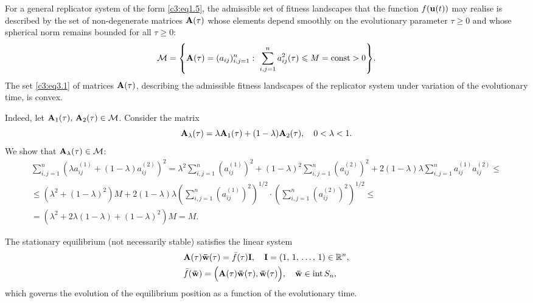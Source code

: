 \documentclass[12pt]{report}
\newcommand{\inside}{\mathrm{int}\,}
\newcommand{\const}{\mathrm{const}}
\theoremstyle{definition}
\theoremstyle{remark}
\begin{document}
For a general replicator system of the form \eqref{c3:eq1.5}, the admissible set of fitness landscapes that the function $f({\bf u}(t))$ may realise is described by the set of non-degenerate matrices ${\bf A}(\tau)$ whose elements depend smoothly on the evolutionary parameter $\tau \geqslant 0$ and whose spherical norm remains bounded for all $\tau \geqslant 0$:
\begin{equation}
	\mathcal{M} = \left\{{\bf A}(\tau) = (a_{ij})_{i, j = 1}^{n}:\,\, \sum
	\limits_{i, j = 1}^{n}a_{ij}^{2}(\tau) \leqslant M = \const > 0\right\}\!.
	\label{c3:eq3.1}
\end{equation}    
The set \eqref{c3:eq3.1} of matrices ${\bf A}(\tau)$, describing the admissible fitness landscapes of the replicator system under variation of the evolutionary time, is convex.

Indeed, let ${\bf A}_1(\tau),\, {\bf A}_2(\tau) \in \mathcal{M}$. Consider the matrix
\begin{equation*}
	{\bf A}_{\lambda}(\tau) = \lambda{\bf A}_1(\tau)+(1-\lambda){\bf A}_2(\tau), \quad 0 < \lambda < 1.
\end{equation*}
We show that ${\bf A}_{\lambda}(\tau) \in \mathcal{M}$:
\begin{gather*}
	\sum\limits_{i,j=1}^n \left(\lambda a_{ij}^{(1)}+(1-\lambda) a_{ij}^{(2)}\right)^2 =
	\lambda^2 \sum\limits_{i,j=1}^n \left(a_{ij}^{(1)}\right)^2
	+ (1-\lambda)^2 \sum\limits_{i,j=1}^n \left(a_{ij}^{(2)}\right)^2
	+ 2(1-\lambda)\lambda \sum\limits_{i,j=1}^n a_{ij}^{(1)} a_{ij}^{(2)} \leqslant \\
	\leqslant \left(\lambda^2 + (1-\lambda)^2\right) M
	+ 2(1-\lambda)\lambda
	\left(\sum\limits_{i,j=1}^n \left(a_{ij}^{(1)}\right)^2\right)^{1/2}
	\cdot
	\left(\sum\limits_{i,j=1}^n \left(a_{ij}^{(2)}\right)^2\right)^{1/2}\leqslant \\
	= \left(\lambda^2 + 2\lambda(1-\lambda) + (1-\lambda)^2\right) M = M.
\end{gather*}

The stationary equilibrium (not necessarily stable) satisfies the linear system
\begin{equation}
	\begin{aligned}
		&{\bf A}(\tau){\bf \bar{w}}(\tau) = \bar{f}(\tau){\bf I}, \quad {\bf I} = (1,\, 1,\, \ldots,\, 1) \in \mathbb{R}^{n}, \\ &\bar{f}({\bf \bar{w}}) = \Big({\bf A}(\tau){\bf \bar{w}}(\tau), {\bf \bar{w}}(\tau)\Big), \quad {\bf \bar{w}} \in \inside S_{n},
	\end{aligned}
	\label{c3:eq3.2}
\end{equation} 
which governs the evolution of the equilibrium position as a function of the evolutionary time. 
\end{document}
